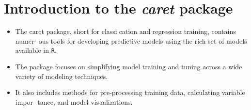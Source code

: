 \documentclass[caret-main.tex]{subfiles}
\begin{document}
\section{Introduction to the \textit{caret} package}

\newpage

\begin{itemize}
\item The caret package, short for classication and regression training, contains numer-
ous tools for developing predictive models using the rich set of models available in \texttt{R}.
\item The package focuses on simplifying model training and tuning across a wide variety of
modeling techniques.
\item It also includes methods for pre-processing training data, calculating variable impor-
tance, and model visualizations.
\end{itemize}
\end{document}
